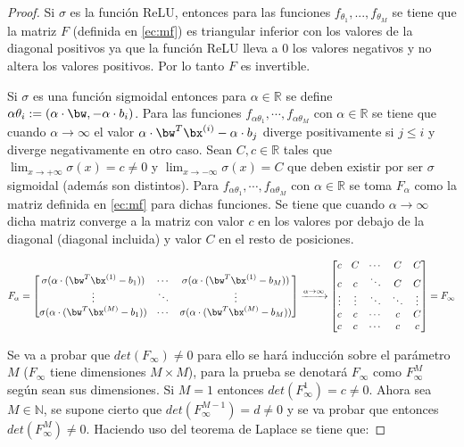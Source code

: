 \begin{proof}
Si $\sigma$ es la función ReLU, entonces para las funciones $f_{\theta_1},... ,f_{\theta_M}$ se tiene que la matriz $F$ (definida en \eqref{ec:mf}) es triangular inferior con los valores de la diagonal positivos ya que la función ReLU lleva a $0$ los valores negativos y no altera los valores positivos. Por lo tanto $F$ es invertible.

Si $\sigma$ es una función sigmoidal entonces para $\alpha \in \mathbb{R}$ se define $\alpha \theta_i := (\alpha \cdot \bw, - \alpha \cdot b_i)$. Para las funciones $f_{\alpha\theta_1},\cdots ,f_{\alpha\theta_M}$ con $\alpha \in \mathbb{R}$ se tiene que cuando $\alpha \rightarrow \infty$ el valor $\alpha \cdot \bw^T\bx^{(i)}-\alpha \cdot b_j$ diverge positivamente si $j\leq i$ y diverge negativamente en otro caso. Sean $C,c\in \mathbb{R}$ tales que $\lim_{x \to +\infty} \sigma(x)=c\neq 0$ y $\lim_{x \to -\infty} \sigma(x)= C$ que deben existir por ser $\sigma$ sigmoidal (además son distintos). Para  $f_{\alpha\theta_1},\cdots ,f_{\alpha\theta_M}$ con $\alpha \in \mathbb{R}$  se toma $F_\alpha$ como la matriz definida en \eqref{ec:mf} para dichas funciones. Se tiene que cuando $\alpha \rightarrow \infty$ dicha matriz converge a la matriz con valor $c$ en los valores por debajo de la diagonal (diagonal incluida) y valor $C$ en el resto de posiciones. 

\begin{align*}
F_\alpha=\begin{bmatrix}
\sigma(\alpha \cdot (\bw^T\bx^{(1)}-b_1)) & \cdots  & \sigma(\alpha \cdot (\bw^T\bx^{(1)}-b_M))\\
\vdots & \ddots & \vdots\\
\sigma(\alpha \cdot (\bw^T\bx^{(M)}-b_1)) & \cdots  & \sigma(\alpha \cdot (\bw^T\bx^{(M)}-b_M))\\
\end{bmatrix}
\xrightarrow{\alpha\rightarrow\infty}
\begin{bmatrix}
c & C & \cdots  & C & C\\
c & c & \ddots & C & C \\
\vdots & \vdots & \ddots  & \ddots & \vdots \\
c & c & \cdots  & c & C\\
c & c & \cdots  & c & c\\
\end{bmatrix} = F_\infty
\end{align*}


Se va a probar que $det(F_\infty) \neq 0$ para ello se hará inducción sobre el parámetro $M$ ($F_\infty$ tiene dimensiones $M\times M$), para la prueba se denotará $F_\infty$ como $F^M_\infty$ según sean sus dimensiones. Si $M = 1$ entonces $det(F^1_\infty) = c \neq 0$. Ahora sea $M\in\mathbb{N}$, se supone cierto que $det(F^{M-1}_\infty) = d \neq 0$ y se va probar que entonces $det(F^{M}_\infty) \neq 0$. Haciendo uso del teorema de Laplace se tiene que:


\end{proof}
